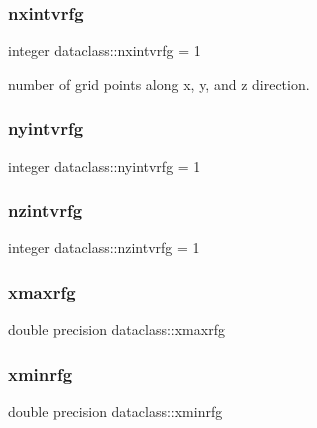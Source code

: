 \subsubsection{\texorpdfstring{nxintvrfg}{nxintvrfg}}
{\footnotesize\ttfamily integer dataclass\+::nxintvrfg = 1}



number of grid points along x, y, and z direction. 

\mbox{\label{group__name_ga32c01f4c7d58343edc8d318b2e5f4760}} 
\subsubsection{\texorpdfstring{nyintvrfg}{nyintvrfg}}
{\footnotesize\ttfamily integer dataclass\+::nyintvrfg = 1}

\mbox{\label{group__name_ga53f757bd562f34f7e8e6bb58606fc289}} 
\subsubsection{\texorpdfstring{nzintvrfg}{nzintvrfg}}
{\footnotesize\ttfamily integer dataclass\+::nzintvrfg = 1}

\mbox{\label{group__name_ga32b5b26da65d1b3507a36c17029a18ae}} 
\subsubsection{\texorpdfstring{xmaxrfg}{xmaxrfg}}
{\footnotesize\ttfamily double precision dataclass\+::xmaxrfg}

\mbox{\label{group__name_gab5b5b652fce1e93de12accd3514958a0}} 
\subsubsection{\texorpdfstring{xminrfg}{xminrfg}}
{\footnotesize\ttfamily double precision dataclass\+::xminrfg}

\mbox{\label{group__name_ga79212aa125148748cc4bd5a11fff492f}} 
